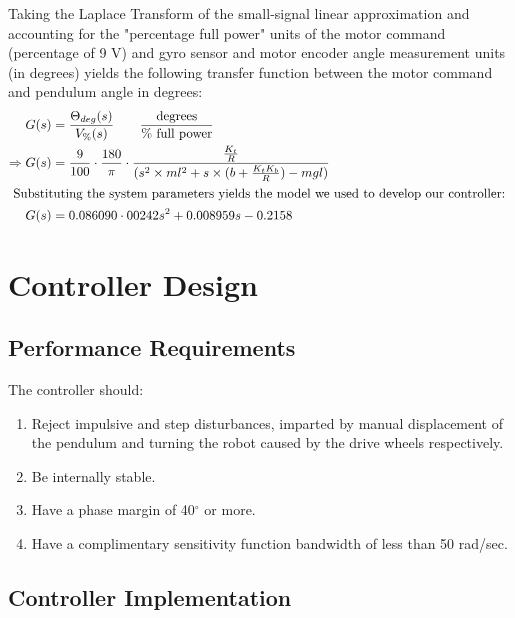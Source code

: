 \documentclass[11pt, a4paper,twocolumn]{article}
\begin{document}
	Taking the Laplace Transform of the small-signal linear approximation and accounting for the "percentage full power" units 	of the motor command (percentage of 9 V) and gyro sensor and motor encoder angle measurement units (in degrees) yields the following transfer function between the motor command and pendulum angle in degrees:
\begin{align*}
	G(s) &= \frac{\Theta_{deg}(s)}{V_\%(s)} \qquad \frac{\text{degrees}}{\text{\% full power}}	\\
	\Rightarrow G(s) &= \frac{9}{100}\cdot \frac{180}{\pi}\cdot \frac{\frac{K_t}{R}}{(s^2 \times ml^2 + s \times (b+ \frac{K_t 					K_b}{R}) - mgl)} \\
\intertext{
	Substituting the system parameters yields the model we used to develop our controller: 
}
	G(s) &= 0.086090\cdot 00242 s^2+ 0.008959 s - 0.2158
\end{align*}

\section{	Controller Design	}\label{sec:design}

	\subsection{	Performance Requirements	}
	The controller should:
	\begin{enumerate}
	\item Reject impulsive and step disturbances, imparted by manual displacement of the pendulum and turning the robot caused by the drive wheels respectively.
	\item Be internally stable.
	\item Have a phase margin of 40$^\circ$ or more.
	\item Have a complimentary sensitivity function bandwidth of less than 50 rad/sec.
	\end{enumerate}
	
	\subsection{	Controller Implementation	}
\end{document}
